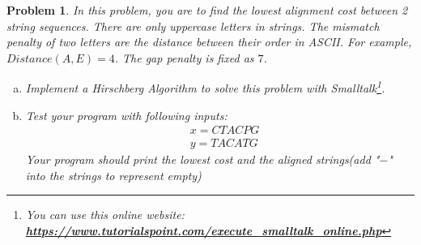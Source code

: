 \documentclass[12pt]{article}
\newtheorem{hw}{Problem}
\begin{document}
\begin{hw}
	In this problem, you are to find the lowest alignment cost between 2 string sequences. There are only uppercase letters in strings. The mismatch penalty of two letters are the distance between their order in ASCII. For example, $Distance(A, E) = 4$. The gap penalty is fixed as $7$. 
	\begin{enumerate}[a)]
	\item Implement a Hirschberg Algorithm to solve this problem with Smalltalk\footnote{You can use this online website: \href{https://www.tutorialspoint.com/execute_smalltalk_online.php}{\textbf{https://www.tutorialspoint.com/execute\_smalltalk\_online.php}}}.
	
	\item Test your program with following inputs:
	\begin{align*}
		&x=CTACPG\\
		&y=TACATG
	\end{align*}
	Your program should print the lowest cost and the aligned strings(add "$-$" into the strings to represent empty)
	\end{enumerate}


	
\end{hw}


\vspace{20pt}
\end{document}
